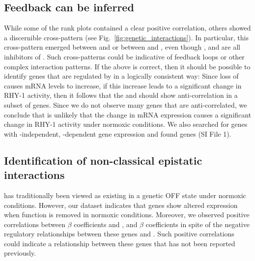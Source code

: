 \subsection*{Feedback can be inferred}
\label{sub:topology}
While some of the rank plots contained a clear positive correlation, others
showed a discernible cross-pattern (see Fig.~\ref{fig:genetic_interactions}). In
particular, this cross-pattern emerged between \vhl{} and \rhy{} or between
\vhl{} and \egl{}, even though ,  and  are
all inhibitors of \hif{}. Such cross-patterns could be indicative of feedback
loops or other complex interaction patterns. If the above is correct, then it
should be possible to identify genes that are regulated by  in a
logically consistent way: Since loss of  causes  mRNA
levels to increase, if this increase leads to a significant change in RHY-1
activity, then it follows that the \egl{} and \rhy{} should show
anti-correlation in a subset of genes. Since we do not observe many genes that
are anti-correlated, we conclude that is unlikely that the change in
 mRNA expression causes a significant change in RHY-1 activity under
normoxic conditions. We also searched for genes with -independent,
-dependent gene expression and found \vhltargets{} genes (SI File
1).



\subsection*{Identification of non-classical epistatic interactions}
\label{sub:hifoh}
\hif{} has traditionally been viewed as existing in a genetic OFF state under
normoxic conditions. However, our dataset indicates that \hifn{} genes show
altered expression when  function is removed in normoxic conditions.
Moreover, we observed positive correlations between \hif{} $\beta$ coefficients
and \egl{}, \vhl{} and \rhy{} $\beta$ coefficients in spite of the negative
regulatory relationships between these genes and . Such positive
correlations could indicate a relationship between these genes that has not
been reported previously.

